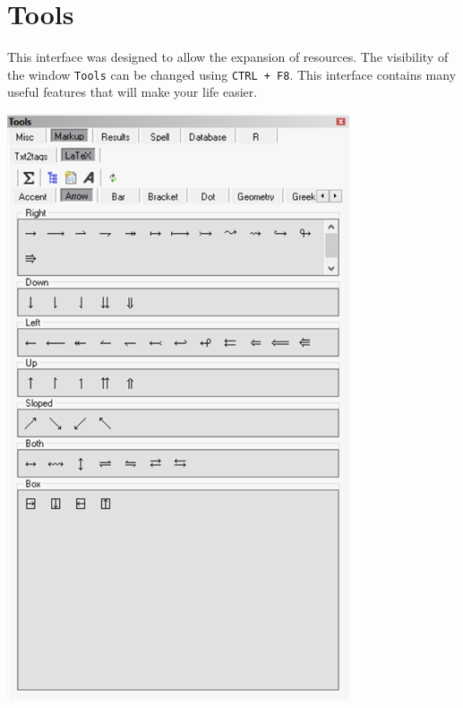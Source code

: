 
\section{Tools}

This interface was designed to allow the expansion of resources.
The visibility of the window \texttt{Tools} can be changed using \texttt{CTRL + F8}.
This interface contains many useful features that will make your life easier.

\vspace{5mm}
\includegraphics[scale=0.60]{./res/tools_markup_latex_arrows.png}
